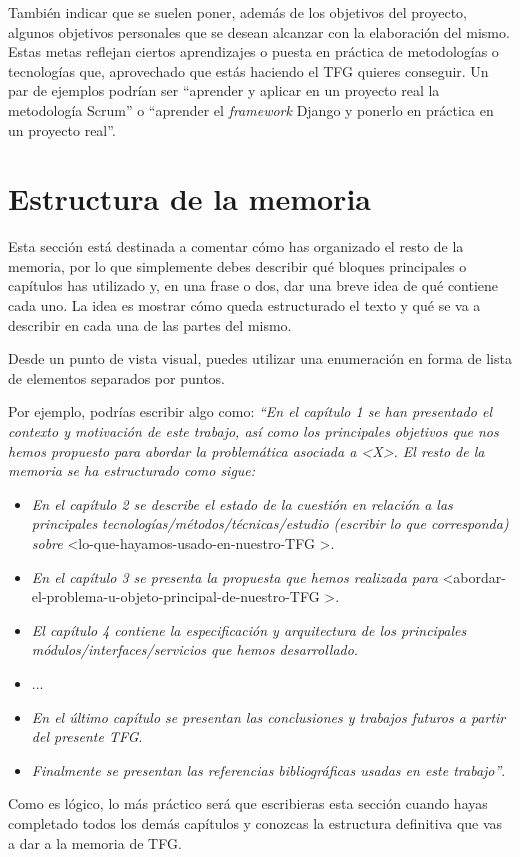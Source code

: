 También indicar que se suelen poner, además de los objetivos del proyecto, algunos objetivos personales que se desean alcanzar con la elaboración del mismo. Estas metas reflejan ciertos aprendizajes o puesta en práctica de metodologías o tecnologías que, aprovechado que estás haciendo el TFG quieres conseguir. Un par de ejemplos podrían ser ``aprender y aplicar en un proyecto real la metodología Scrum'' o ``aprender el \textit{framework} Django y ponerlo en práctica en un proyecto real''. 

\section{Estructura de la memoria}
Esta sección está destinada a comentar cómo has organizado el resto de la memoria, por lo que simplemente debes describir qué bloques principales o capítulos has utilizado y, en una frase o dos, dar una breve idea de qué contiene cada uno. La idea es mostrar cómo queda estructurado el texto y qué se va a describir en cada una de las partes del mismo.

Desde un punto de vista visual, puedes utilizar una enumeración en forma de lista de elementos separados por puntos.

Por ejemplo, podrías escribir algo como: \textit{``En el capítulo 1 se han presentado el contexto y motivación de este trabajo, así como los principales objetivos que nos hemos propuesto para abordar la problemática asociada a \textless X\textgreater. El resto de la memoria se ha estructurado como sigue:}

\begin{itemize}
  \item \textit{En el capítulo 2 se describe el estado de la cuestión en relación a las principales tecnologías/métodos/técnicas/estudio (escribir lo que corresponda) sobre} \textless lo-que-hayamos-usado-en-nuestro-TFG \textgreater.
  \item \textit{En el capítulo 3 se presenta la propuesta que hemos realizada para} \textless abordar-el-problema-u-objeto-principal-de-nuestro-TFG \textgreater.
  \item \textit{El capítulo 4 contiene la especificación y arquitectura de los principales módulos/interfaces/servicios que hemos desarrollado}.
  \item ...
  \item \textit{En el último capítulo se presentan las conclusiones y trabajos futuros a partir del presente TFG}.
  \item \textit{Finalmente se presentan las referencias bibliográficas usadas en este trabajo''}.
\end{itemize}

Como es lógico, lo más práctico será que escribieras esta sección cuando hayas completado todos los demás capítulos y conozcas la estructura definitiva que vas a dar a la memoria de TFG.
